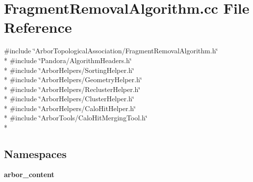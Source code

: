 \section{Fragment\+Removal\+Algorithm.\+cc File Reference}
\label{FragmentRemovalAlgorithm_8cc}
{\ttfamily \#include \char`\"{}Arbor\+Topological\+Association/\+Fragment\+Removal\+Algorithm.\+h\char`\"{}}\\*
{\ttfamily \#include \char`\"{}Pandora/\+Algorithm\+Headers.\+h\char`\"{}}\\*
{\ttfamily \#include \char`\"{}Arbor\+Helpers/\+Sorting\+Helper.\+h\char`\"{}}\\*
{\ttfamily \#include \char`\"{}Arbor\+Helpers/\+Geometry\+Helper.\+h\char`\"{}}\\*
{\ttfamily \#include \char`\"{}Arbor\+Helpers/\+Recluster\+Helper.\+h\char`\"{}}\\*
{\ttfamily \#include \char`\"{}Arbor\+Helpers/\+Cluster\+Helper.\+h\char`\"{}}\\*
{\ttfamily \#include \char`\"{}Arbor\+Helpers/\+Calo\+Hit\+Helper.\+h\char`\"{}}\\*
{\ttfamily \#include \char`\"{}Arbor\+Tools/\+Calo\+Hit\+Merging\+Tool.\+h\char`\"{}}\\*
\subsection*{Namespaces}
\begin{DoxyCompactItemize}
\item 
 {\bf arbor\+\_\+content}
\end{DoxyCompactItemize}
